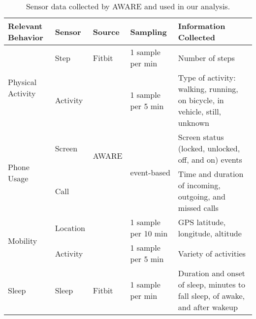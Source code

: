 \begin{table}[]
\centering
\smaller
\begin{tabular}{|l|l|l|l|p{5.5cm}|}
\hline
\textbf{Relevant Behavior}         & \textbf{Sensor} & \textbf{Source}        & \textbf{Sampling}            & \textbf{Information Collected}                                                 \\ \hline
\multirow{2}{*}{Physical Activity} & Step            & Fitbit                 & 1 sample per min             & Number of steps                                                                \\ \cline{2-5} 
                                   & Activity        & \multirow{4}{*}{AWARE} & 1 sample per 5 min           & Type of activity: walking, running, on bicycle, in vehicle, still, unknown     \\ \cline{1-2} \cline{4-5} 
\multirow{2}{*}{Phone Usage}                        & Screen          &                        & \multirow{2}{*}{event-based} & Screen status (locked, unlocked, off, and on) events                           \\ \cline{1-2} \cline{5-5} 
\multirow{2}{*}{Social Interactions} & Call            &                        &                              & Time and duration of incoming, outgoing, and missed calls                      \\ \cline{1-2} \cline{4-5} 
\multirow{2}{*}{Mobility}               & Location        &                        & 1 sample per 10 min          & GPS latitude, longitude, altitude                                              \\ \cline{2-2} \cline{4-5}
& Activity & & 1 sample per 5 min & Variety of activities \\ \hline
\multirow{2}{*}{Sleep }                             & Sleep           & Fitbit                 & 1 sample per min             & Duration and onset of sleep, minutes to fall sleep, of awake, and after wakeup \\ \hline
\end{tabular}

\caption[Sensors]{Sensor data collected by AWARE and used in our analysis.}
\label{tab:study-sensors}
\end{table}
